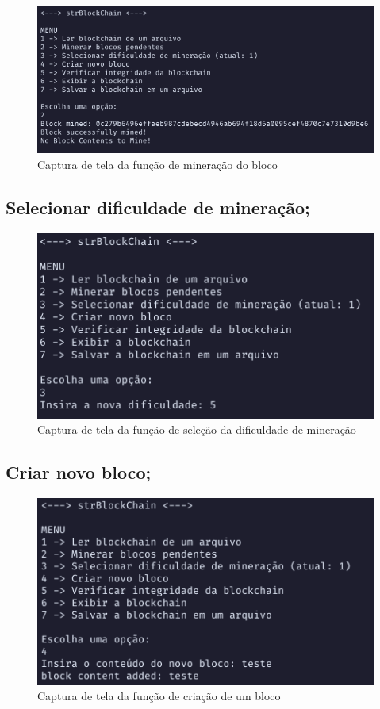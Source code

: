 \documentclass{article}
\begin{document}
\begin{figure}[H]
\begin{center}
\includegraphics[scale=0.5]{mineBlock.png}
  \caption{Captura de tela da função de mineração do bloco}
\end{center}
\end{figure}

\subsection{Selecionar dificuldade de mineração;}
\begin{figure}[H]
  \begin{center}
    \includegraphics[scale=0.5]{selectDif.png}
    \caption{Captura de tela da função de seleção da dificuldade de mineração}
  \end{center}
\end{figure}

\subsection{Criar novo bloco;}
\begin{figure}[H]
\begin{center}
\includegraphics[scale=0.5]{insertBlock.png}
  \caption{Captura de tela da função de criação de um bloco}
\end{center}
\end{figure}
\end{document}
